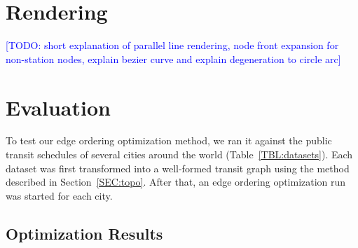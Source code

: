\documentclass{llncs}
\newcommand\todo[1]{\textcolor{blue}{[TODO: #1]}}
\begin{document}
%
\section{Rendering}\label{SEC:rendering}
%
\todo{short explanation of parallel line rendering, node front expansion for non-station nodes, explain bezier curve and explain degeneration to circle arc}

%
\section{Evaluation}
%

To test our edge ordering optimization method, we ran it against the public transit schedules of several cities around the world (Table~\ref{TBL:datasets}). Each dataset was first transformed into a well-formed transit graph using the method described in Section~\ref{SEC:topo}. After that, an edge ordering optimization run was started for each city.

%
\subsection{Optimization Results}
%
\end{document}
